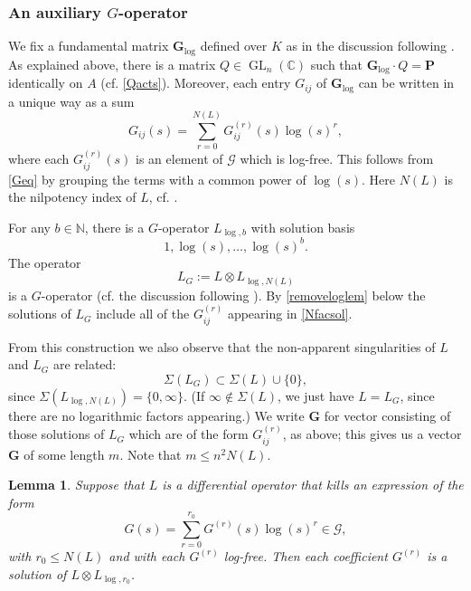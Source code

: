 \documentclass[10pt]{article}
\numberwithin{equation}{section}
\theoremstyle{plain}
\newtheorem{lem}[thm]{Lemma}
\theoremstyle{definition}
\theoremstyle{remark}
\newcommand{\GL}{\operatorname{GL}}
\newcommand{\N}{\mathbb{N}}
\begin{document}
\subsubsection{An auxiliary $G$-operator}
\label{auxGopsec}

We fix a fundamental matrix $\mathbf{G}_{\operatorname{log}}$ defined over $K$ as in the discussion following . %
As explained above, there is a matrix $Q \in \GL_{n}(\mathbb{C})$ such that $ \mathbf{G}_{\operatorname{log}} \cdot Q = \mathbf{P}$ identically on $A$ (cf. \eqref{Qacts}). Moreover, each entry $G_{ij}$ of $\mathbf{G}_{\operatorname{log}}$ can be written in a unique way as a sum
\begin{equation}
\label{Nfacsol}
G_{ij}(s) = \sum_{r = 0}^{N(L)} G^{(r)}_{ij}(s) \log(s)^{r} , 
\end{equation}
where each $G^{(r)}_{ij}(s)$ is an element of $\mathcal{G}$ which is log-free. This follows from \eqref{Geq} by grouping the terms with a common power of $\log(s)$. Here $N(L)$ is the nilpotency index of $L$, cf. .


For any $b \in \N$, there is a $G$-operator $L_{\log,b}$ with solution basis
\begin{displaymath}
    1, \log(s), \dots, \log(s)^b.
\end{displaymath}
The operator
\begin{equation}\label{eqLG}
    L_G:= L \otimes L_{\log, N(L)}
\end{equation}
is a $G$-operator (cf. the discussion following ). By \autoref{removeloglem} below the solutions of $L_{G}$ include all of the $G^{(r)}_{ij}$ appearing in \eqref{Nfacsol}.

From this construction we also observe that the non-apparent singularities of $L$ and $L_G$ are related:
\begin{displaymath}
    \Sigma(L_G) \subset \Sigma (L) \cup \{0\},
\end{displaymath}
since $\Sigma (L_{\log, N(L)})=\{0,\infty\}$. (If $\infty \notin \Sigma(L)$, we just have $L=L_G$, since there are no logarithmic factors appearing.) We write $\mathbf{G}$ for vector consisting of those solutions of $L_{G}$ which are of the form $G^{(r)}_{ij}$, as above; this gives us a vector $\mathbf{G}$ of some length $m$. Note that $m \leq n^2 N(L)$.

\begin{lem}
\label{removeloglem}
Suppose that $L$ is a differential operator that kills an expression of the form
\begin{equation}
\label{Nfacsol2}
G(s) = \sum_{r = 0}^{r_{0}} G^{(r)}(s) \log(s)^{r} \in \mathcal{G} , 
\end{equation}
with $r_{0} \leq N(L)$ and with each $G^{(r)}$ log-free. Then each coefficient $G^{(r)}$ is a solution of $L \otimes L_{\operatorname{log},r_{0}}$.
\end{lem}
\end{document}
